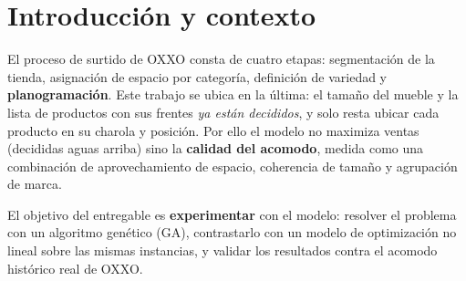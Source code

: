 \documentclass[11pt,letterpaper]{article}
\begin{document}
\begin{abstract}
\noindent Este trabajo aborda el problema de \emph{planogramaci\'on} de tiendas
OXXO: dada la asignaci\'on de productos y sus frentes (decidida en etapas previas
del proceso comercial), se determina la ubicaci\'on \'optima de cada producto
dentro de un mueble de cuarto fr\'io. Se presenta un algoritmo gen\'etico (en dos
variantes, no extendida y extendida) y se compara contra un modelo no lineal tipo
\emph{random-key} resuelto por \textbf{evoluci\'on diferencial} (\emph{Differential
Evolution}), sobre cuatro formatos de planograma reconstruidos del hist\'orico. La
funci\'on objetivo, no lineal por su t\'ermino de varianza, maximiza aprovechamiento
de espacio, coherencia de tama\~no y agrupaci\'on de marca. El algoritmo gen\'etico
supera tanto al acomodo experto hist\'orico como al modelo no lineal en los cuatro
formatos, con aprovechamiento de espacio entre 90.9\,\% y 95.7\,\%.
\end{abstract}

{\small\tableofcontents}
\thispagestyle{fancy}
\newpage

\section{Introducci\'on y contexto}
El proceso de surtido de OXXO consta de cuatro etapas: segmentaci\'on de la tienda,
asignaci\'on de espacio por categor\'ia, definici\'on de variedad y
\textbf{planogramaci\'on}. Este trabajo se ubica en la \'ultima: el tama\~no del
mueble y la lista de productos con sus frentes \emph{ya est\'an decididos}, y solo
resta ubicar cada producto en su charola y posici\'on. Por ello el modelo no
maximiza ventas (decididas aguas arriba) sino la \textbf{calidad del acomodo},
medida como una combinaci\'on de aprovechamiento de espacio, coherencia de tama\~no
y agrupaci\'on de marca.

El objetivo del entregable es \textbf{experimentar} con el modelo: resolver el
problema con un algoritmo gen\'etico (GA), contrastarlo con un modelo de
optimizaci\'on no lineal sobre las mismas instancias, y validar los resultados
contra el acomodo hist\'orico real de OXXO.

\end{document}
